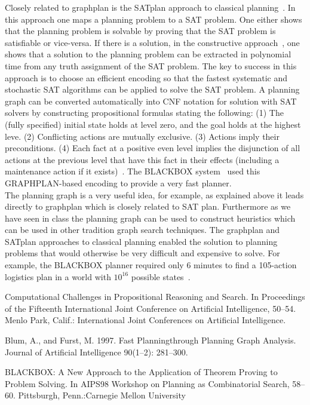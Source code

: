 \documentclass[11pt]{article}
\begin{document}
Closely related to graphplan  is the SATplan approach to classical planning~\cite{SKM 1997}. In this approach one maps a planning problem to a SAT problem. One either shows that the planning problem is solvable by proving that the SAT problem is satisfiable or vice-versa. If there is a solution, in the constructive approach~\cite{SKM 1997}, one shows that a solution to the planning problem can be extracted in polynomial time from any truth assignment of the SAT problem. The key to success in this approach is to choose an efficient encoding so that the fastest systematic and stochastic SAT algorithms can be applied to solve the SAT problem. A planning graph can be converted automatically into CNF notation for solution with SAT solvers by constructing propositional formulas stating the following: (1) The (fully specified) initial state holds at level zero, and the goal holds at the highest leve. (2) Conflicting actions are mutually exclusive. (3) Actions imply their preconditions. (4) Each fact at a positive even level implies the disjunction of all actions at the previous level that have this fact in their effects (including a maintenance action if it exists)~\cite{SKM 1997}.  The BLACKBOX system~\cite{Kautz and Selman 1998a} used this GRAPHPLAN-based encoding to provide a very fast planner.\\


The planning graph is a very useful idea, for example, as explained above it leads directly to graphplan which is closely related to SAT plan. Furthermore as we have seen in class the planning graph can be used to construct heuristics which can be used in other tradition graph search techniques. The graphplan and SATplan approaches to classical planning enabled the solution to planning problems that would otherwise be very difficult and expensive to solve. For example, the BLACKBOX planner required only 6 minutes to find a 105-action logistics plan in a world with $10^{16}$ possible states~\cite{Kautz and Selman 1998a}.
 
\begin{thebibliography}{99}
Computational Challenges in Propositional Reasoning and Search. In Proceedings of the Fifteenth International Joint Conference on Artificial Intelligence, 50–54. Menlo Park, Calif.: International Joint Conferences on Artificial Intelligence. 

Blum, A., and Furst, M. 1997. Fast Planningthrough Planning Graph Analysis. Journal of Artificial Intelligence 90(1–2): 281–300. 

BLACKBOX: A New Approach to the Application of Theorem Proving to Problem Solving. In AIPS98 Workshop on Planning as Combinatorial Search, 58–60. Pittsburgh, Penn.:Carnegie Mellon University
\end{thebibliography}
\end{document}
